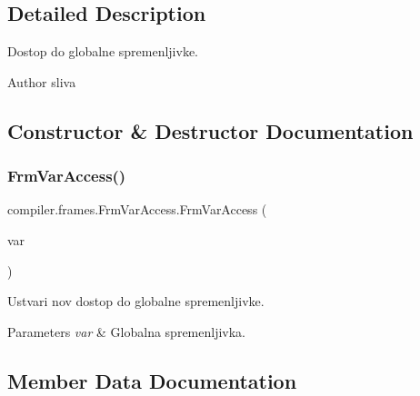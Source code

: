 \subsection{Detailed Description}
Dostop do globalne spremenljivke.

\begin{DoxyAuthor}{Author}
sliva 
\end{DoxyAuthor}


\subsection{Constructor \& Destructor Documentation}
\mbox{\label{classcompiler_1_1frames_1_1_frm_var_access_a53b7c22439429fabf33f85f7d3dd584d}} 
\subsubsection{\texorpdfstring{Frm\+Var\+Access()}{FrmVarAccess()}}
{\footnotesize\ttfamily compiler.\+frames.\+Frm\+Var\+Access.\+Frm\+Var\+Access (\begin{DoxyParamCaption}\item[{\hyperlink{classcompiler_1_1abstr_1_1tree_1_1def_1_1_abs_var_def}{Abs\+Var\+Def}}]{var }\end{DoxyParamCaption})}

Ustvari nov dostop do globalne spremenljivke.


\begin{DoxyParams}{Parameters}
{\em var} & Globalna spremenljivka. \\
\hline
\end{DoxyParams}


\subsection{Member Data Documentation}
\mbox{\label{classcompiler_1_1frames_1_1_frm_var_access_aa1b039b4a9029849e100486b045ecd3c}} 
